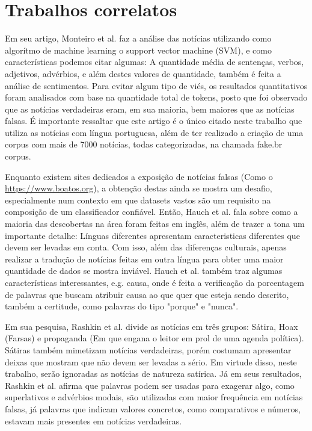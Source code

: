 \documentclass[conference]{IEEEtran}
\begin{document}
\section{Trabalhos correlatos}

Em seu artigo, Monteiro et al. \cite{b3} faz a análise das notícias utilizando como algorítmo de machine learning o support vector machine (SVM), e como características podemos citar algumas: A quantidade média de sentenças, verbos, adjetivos, advérbios, e além destes valores de quantidade, também é feita a análise de sentimentos. Para evitar algum tipo de viés, os resultados quantitativos foram analisados com base na quantidade total de tokens, posto que foi observado que as notícias verdadeiras eram, em sua maioria, bem maiores que as notícias falsas. É importante ressaltar que este artigo é o único citado neste trabalho que utiliza as notícias com língua portuguesa, além de ter realizado a criação de uma corpus com mais de 7000 notícias, todas categorizadas, na chamada fake.br corpus.

Enquanto existem sites dedicados a exposição de notícias falsas (Como o \url{https://www.boatos.org}), a obtenção destas ainda se mostra um desafio, especialmente num contexto em que datasets vastos são um requisito na composição de um classificador confiável. Então, Hauch et al. \cite{b4} fala sobre como a maioria das descobertas na área foram feitas em inglês, além de trazer a tona um importante detalhe: Línguas diferentes apresentam caracteristicas diferentes que devem ser levadas em conta. Com isso, além das diferenças culturais, apenas realizar a tradução de notícias feitas em outra língua para obter uma maior quantidade de dados se mostra inviável. Hauch et al. também traz algumas características interessantes, e.g. causa, onde é feita a verificação da porcentagem de palavras que buscam atribuir causa ao que quer que esteja sendo descrito, também a certitude, como palavras do tipo "porque" e "nunca".

Em sua pesquisa, Rashkin et al. \cite{b5} divide as notícias em três grupos: Sátira, Hoax (Farsas) e propaganda (Em que engana o leitor em prol de uma agenda política). Sátiras também mimetizam notícias verdadeiras, porém costumam apresentar deixas que mostram que não devem ser levadas a sério. Em virtude disso, neste trabalho, serão ignoradas as notícias de natureza satírica. Já em seus resultados, Rashkin et al. afirma que palavras podem ser usadas para exagerar algo, como superlativos e advérbios modais, são utilizadas com maior frequência em notícias falsas, já palavras que indicam valores concretos, como comparativos e números, estavam mais presentes em notícias verdadeiras.
\end{document}
